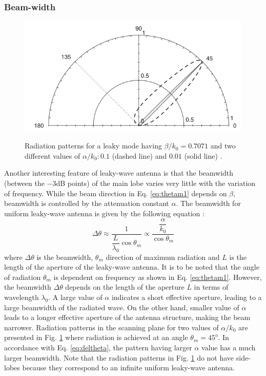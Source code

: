 
\subsubsection{Beam-width}
 \begin{figure}[t]
	\centering
 	\noindent
 	{\includegraphics[scale=.6, keepaspectratio=true]{Figures/Chapter1/LWA_performance/beamwidth.PNG}}
 	\caption[Radiation patterns showing the variation of beamwidth with the change of leakage constant of a leaky-wave antenna.]{Radiation patterns for a leaky mode having $\beta/k_0=0.7071$ and two different values of $\alpha/k_0:0.1$ (dashed line) and $0.01$ (solid line) \cite{Jackson2008}.}
 	\label{fig:fixedBW}
 \end{figure}

Another interesting feature of leaky-wave antenna is that the beamwidth (between the $-3$dB points) of the main lobe varies very little with the variation of frequency. While the beam direction in Eq. \ref{eq:thetam1} depends on $\beta$, beamwidth is controlled by the attenuation constant $\alpha$. The beamwidth for uniform leaky-wave antenna is given by the following equation \cite{Jackson2008}:
%
\begin{equation}\label{eq:deltheta}
  \Delta \theta  \approx \dfrac{1}{{\dfrac{L}{{{\lambda _0}}}\cos {\theta _m}}}  \propto \dfrac{\dfrac{\alpha}{k_0}}{\cos {\theta _m}}
\end{equation}
%
where $\Delta \theta$ is the beamwidth, $\theta _m$ direction of maximum radiation and $L$ is the length of the aperture of the leaky-wave antenna. It is to be noted that the angle of radiation $\theta_m$ is dependent on frequency as shown in Eq. \ref{eq:thetam1}. However, the beamwidth $\Delta \theta$ depends on the length of the aperture $L$ in terms of wavelength $\lambda_0$. A large value of $\alpha$ indicates a short effective aperture, leading to a large beamwidth of the radiated wave. On the other hand, smaller value of $\alpha$ leads to a longer effective aperture of the antenna structure, making the beam narrower. Radiation patterns in the scanning plane for two values of $\alpha/k_0$ are presented in Fig. \ref{fig:fixedBW} \cite{Jackson2008} where radiation is achieved at an angle $\theta _m = 45^o$. In accordance with Eq. \ref{eq:deltheta}, the pattern having larger $\alpha$ value has a much larger beamwidth. Note that the radiation patterns in Fig. \ref{fig:fixedBW} do not have side-lobes because they correspond to an infinite uniform leaky-wave antenna.

